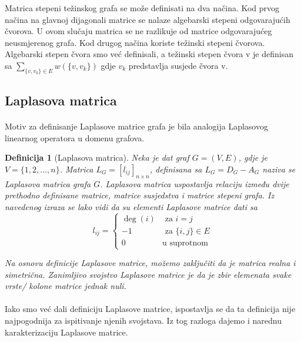 \documentclass[11pt]{article}
\newtheorem{definition}{Definicija}
\begin{document}
			Matrica stepeni težinskog grafa se može definisati na dva načina. Kod prvog načina na glavnoj dijagonali matrice se nalaze algebarski stepeni odgovarajućih čvorova. U ovom slučaju matrica se ne razlikuje
			od matrice odgovarajućeg neusmjerenog grafa. Kod drugog načina koriste težinski stepeni čvorova.
			Algebarski stepen čvora smo već definisali, a težinski stepen čvora v je definisan sa $\sum_{\{v,v_k\} \in E} w(\{v,v_k\})$ gdje $v_k$ predstavlja susjede čvora v.  
		
		\subsection{Laplasova matrica}
		\paragraph{}
			Motiv za definisanje Laplasove matrice grafa je bila analogija Laplasovog linearnog operatora u domenu grafova.

			\begin{definition}[Laplasova matrica] 
			Neka je dat graf $G = (V, E)$, gdje je $V = \{1, 2, \dots, n\}$. Matrica $L_G = [l_{ij}]_{n \times n}$, definisana sa $L_G = D_G - A_G$ naziva se Laplasova matrica grafa $G$.
			Laplasova matrica uspostavlja relaciju između dvije prethodno definisane matrice, matrice susjedstva i matrice stepeni grafa.
			Iz navedenog izraza se lako vidi da su elementi Laplasove matrice dati sa
			 \[
				 l_{ij} =
				 \begin{cases}
				 \deg(i)  & \text{ za } i = j \\
				 -1 & \text{ za } \{i, j\} \in E \\ 
				 0  & \text{u suprotnom}
				 \end{cases}
			 \]
			
			Na osnovu definicije Laplasove matrice, možemo zaključiti da je matrica realna i simetrična.
			Zanimljivo svojstvo Laplasove matrice je da je zbir elemenata svake vrste/ kolone matrice jednak nuli.
			\end{definition}
	
			\paragraph{}
			Iako smo već dali definiciju Laplasove matrice, ispostavlja se da ta definicija nije najpogodnija za ispitivanje njenih svojstava. Iz tog razloga dajemo i narednu karakterizaciju Laplasove matrice.
	
\end{document}
